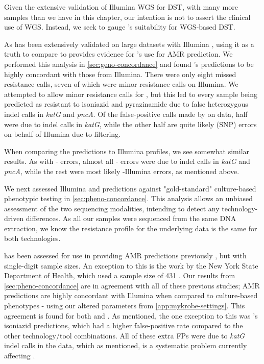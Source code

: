 \hspace{0.75cm}

\noindent
Given the extensive validation of Illumina WGS for DST, with many more samples than we have in this chapter, our intention is not to assert the clinical use of WGS. Instead, we seek to gauge \ont{}'s suitability for WGS-based DST. 

As \mykrobe{} has been extensively validated on large datasets with Illumina \cite{bradley2015,hunt2019}, using it as a truth to compare \ont{} to provides evidence for \ont{}'s use for AMR prediction. We performed this analysis in \autoref{sec:geno-concordance} and found \mykrobe{}'s \ont{} predictions to be highly concordant with those from Illumina. There were only eight missed resistance calls, seven of which were minor resistance calls on Illumina. We attempted to allow minor resistance calls for \ont{}, but this led to every sample being predicted as resistant to isoniazid and pyrazinamide due to false heterozygous indel calls in \textit{katG} and \textit{pncA}. Of the false-positive calls made by \mykrobe{} on \ont{} data, half were due to indel calls in \textit{katG}, while the other half are quite likely (SNP) errors on behalf of Illumina due to filtering.

When comparing the \drprg{} predictions to \mykrobe{} Illumina profiles, we see somewhat similar results. As with \mykrobe{}-\ont{} errors, almost all \drprg{}-\ont{} errors were due to indel calls in \textit{katG} and \textit{pncA}, while the rest were most likely \mykrobe{}-Illumina errors, as mentioned above. 

\noindent
We next assessed Illumina and \ont{} predictions against "gold-standard" culture-based phenotypic testing in \autoref{sec:pheno-concordance}. This analysis allows an unbiased assessment of the two sequencing modalities, intending to detect any technology-driven differences. As all our samples were sequenced from the same DNA extraction, we know the resistance profile for the underlying data is the same for both technologies. 

\ont{} has been assessed for use in providing AMR predictions previously \cite{bradley2015,hunt2019,phelan2019}, but with single-digit sample sizes. An exception to this is the work by the New York State Department of Health, which used a sample size of 431 \cite{smith2020}. Our results from \autoref{sec:pheno-concordance} are in agreement with all of these previous studies; \ont{} AMR predictions are highly concordant with Illumina when compared to culture-based phenotypes - using our altered parameters from \autoref{app:mykrobe-settings}. This agreement is found for both \mykrobe{} and \drprg{}. As mentioned, the one exception to this was \mykrobe{}'s \ont{} isoniazid predictions, which had a higher false-positive rate compared to the other technology/tool combinations. All of these extra FPs were due to \textit{katG} indel calls in the \ont{} data, which as mentioned, is a systematic problem currently affecting \ont{} \cite{watson2019}.

